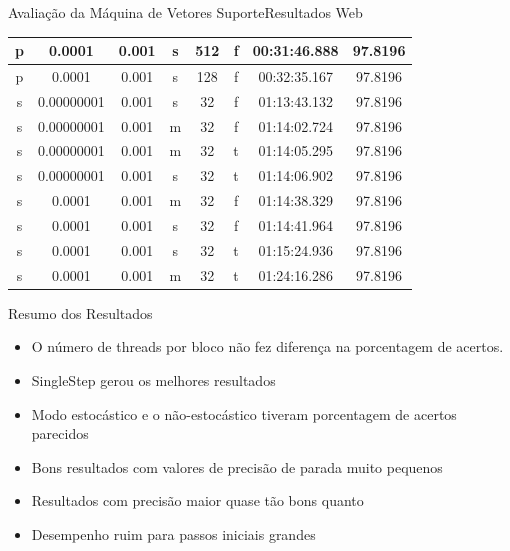\documentclass{beamer}
\begin{document}
\begin{frame}{Avaliação da Máquina de Vetores Suporte}{Resultados Web}
\begin{table}
\begin{tabular}{|c|c|c|c|c|c|c|c|}
		p & 0.0001 & 0.001 & s & 512 & f & 00:31:46.888 & 97.8196\\ \hline
		p & 0.0001 & 0.001 & s & 128 & f & 00:32:35.167 & 97.8196\\ \hline
		s & 0.00000001 & 0.001 & s & 32 & f & 01:13:43.132 & 97.8196\\ \hline
		s & 0.00000001 & 0.001 & m & 32 & f & 01:14:02.724 & 97.8196\\ \hline
		s & 0.00000001 & 0.001 & m & 32 & t & 01:14:05.295 & 97.8196\\ \hline
		s & 0.00000001 & 0.001 & s & 32 & t & 01:14:06.902 & 97.8196\\ \hline
		s & 0.0001 & 0.001 & m & 32 & f & 01:14:38.329 & 97.8196\\ \hline
		s & 0.0001 & 0.001 & s & 32 & f & 01:14:41.964 & 97.8196\\ \hline
		s & 0.0001 & 0.001 & s & 32 & t & 01:15:24.936 & 97.8196\\ \hline
		s & 0.0001 & 0.001 & m & 32 & t & 01:24:16.286 & 97.8196\\ \hline
    \end{tabular}
\end{table}
\end{frame}

\begin{frame}{Resumo dos Resultados}
    \begin{itemize}
        \item O número de threads por bloco não fez diferença na porcentagem de acertos.
        \item SingleStep gerou os melhores resultados
        \item Modo estocástico e o não-estocástico tiveram porcentagem de acertos parecidos
        \item Bons resultados com valores de precisão de parada muito pequenos
        \item Resultados com precisão maior quase tão bons quanto
        \item Desempenho ruim para passos iniciais grandes
    \end{itemize}
\end{frame}
\end{document}
